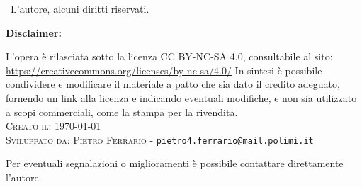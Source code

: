 \textcopyright \ L'autore, alcuni diritti riservati.\\
\vspace*{6pt}

\textbf{Disclaimer:} 
\vspace*{12pt}

L'opera è rilasciata sotto la licenza CC BY-NC-SA 4.0, consultabile al sito:\\
\url{https://creativecommons.org/licenses/by-nc-sa/4.0/}
\newline
In sintesi è possibile condividere e modificare il materiale a patto che sia dato il credito adeguato,  fornendo un link alla licenza e indicando eventuali modifiche, e non sia utilizzato a scopi commerciali, come la stampa per la rivendita.\\

\noindent\textsc{Creato il:} \today\\
\noindent\textsc{Sviluppato da:}
\textsc{Pietro Ferrario} - \texttt{pietro4.ferrario@mail.polimi.it}

Per eventuali segnalazioni o miglioramenti è possibile contattare direttamente l'autore.